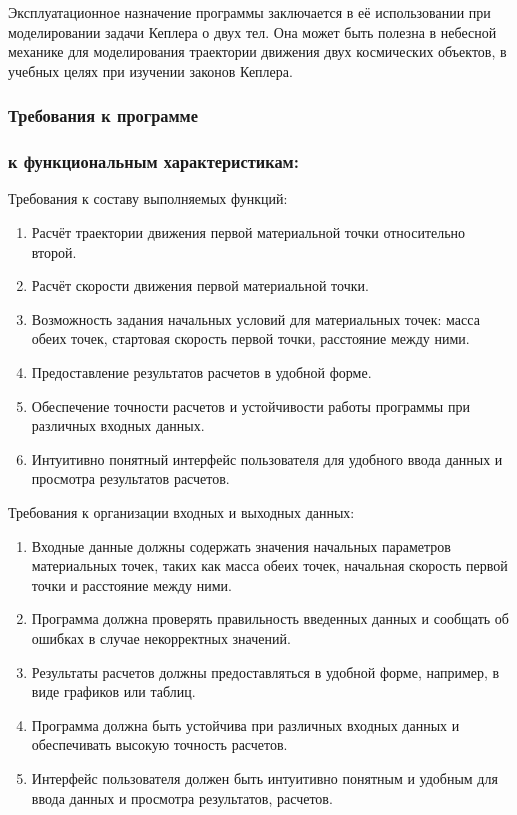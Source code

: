  Эксплуатационное назначение программы заключается в её использовании при моделировании задачи Кеплера о двух тел. Она может быть полезна в небесной механике для моделирования траектории движения двух космических объектов, в учебных целях при изучении законов Кеплера.\newline
 \begin{center}\subsubsection*{Требования к программе}\end{center}

 \subsubsection*{ к функциональным характеристикам:\newline}

 Требования к составу выполняемых функций:

 \begin{enumerate}
  \item Расчёт траектории движения первой материальной точки относительно второй.
  \item Расчёт скорости движения первой материальной точки.
  \item Возможность задания начальных условий для материальных точек: масса обеих точек, стартовая скорость первой точки, расстояние между ними.
  \item Предоставление результатов расчетов в удобной форме.
  \item Обеспечение точности расчетов и устойчивости работы программы при различных входных данных.
  \item Интуитивно понятный интерфейс пользователя для удобного ввода данных и просмотра результатов расчетов.\newline
 \end{enumerate}

 Требования к организации входных и выходных данных:

 \begin{enumerate}
  \item Входные данные должны содержать значения начальных параметров материальных точек, таких как масса обеих точек, начальная скорость первой точки и расстояние между ними.
  \item Программа должна проверять правильность введенных данных и сообщать об ошибках в случае некорректных значений.
  \item Результаты расчетов должны предоставляться в удобной форме, например, в виде графиков или таблиц.
  \item Программа должна быть устойчива при различных входных данных и обеспечивать высокую точность расчетов.
  \item Интерфейс пользователя должен быть интуитивно понятным и удобным для ввода данных и просмотра результатов, расчетов.\newline
 \end{enumerate}

